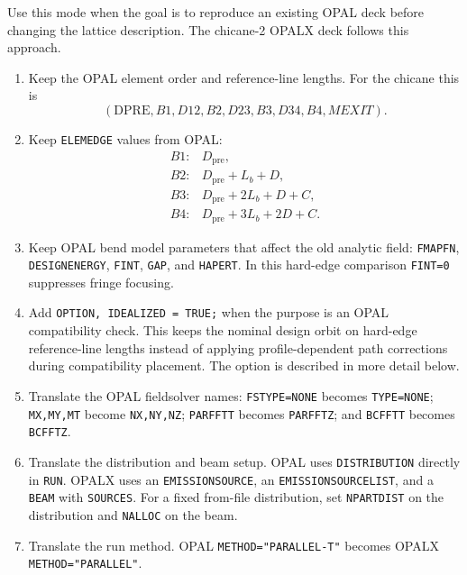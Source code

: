 \documentclass[11pt,a4paper]{article}
\begin{document}
Use this mode when the goal is to reproduce an existing OPAL deck before
changing the lattice description.  The chicane-2 OPALX deck follows this
approach.
\begin{enumerate}
  \item Keep the OPAL element order and reference-line lengths.  For the
        chicane this is
        \[
          (\mathrm{DPRE}, B1, D12, B2, D23, B3, D34, B4, MEXIT).
        \]
  \item Keep \texttt{ELEMEDGE} values from OPAL:
        \[
        \begin{array}{ll}
          B1: & D_{\mathrm{pre}},\\
          B2: & D_{\mathrm{pre}} + L_b + D,\\
          B3: & D_{\mathrm{pre}} + 2L_b + D + C,\\
          B4: & D_{\mathrm{pre}} + 3L_b + 2D + C.
        \end{array}
        \]
  \item Keep OPAL bend model parameters that affect the old analytic field:
        \texttt{FMAPFN}, \texttt{DESIGNENERGY}, \texttt{FINT},
        \texttt{GAP}, and \texttt{HAPERT}.  In this hard-edge comparison
        \texttt{FINT=0} suppresses fringe focusing.
  \item Add \texttt{OPTION, IDEALIZED = TRUE;} when the purpose is an OPAL
        compatibility check.  This keeps the nominal design orbit on
        hard-edge reference-line lengths instead of applying
        profile-dependent path corrections during compatibility placement.
        The option is described in more detail below.
  \item Translate the OPAL fieldsolver names:
        \texttt{FSTYPE=NONE} becomes \texttt{TYPE=NONE};
        \texttt{MX,MY,MT} become \texttt{NX,NY,NZ};
        \texttt{PARFFTT} becomes \texttt{PARFFTZ}; and
        \texttt{BCFFTT} becomes \texttt{BCFFTZ}.
  \item Translate the distribution and beam setup.  OPAL uses
        \texttt{DISTRIBUTION} directly in \texttt{RUN}.  OPALX uses an
        \texttt{EMISSIONSOURCE}, an \texttt{EMISSIONSOURCELIST}, and a
        \texttt{BEAM} with \texttt{SOURCES}.  For a fixed from-file
        distribution, set \texttt{NPARTDIST} on the distribution and
        \texttt{NALLOC} on the beam.
  \item Translate the run method.  OPAL \texttt{METHOD="PARALLEL-T"} becomes
        OPALX \texttt{METHOD="PARALLEL"}.
\end{enumerate}
\end{document}
